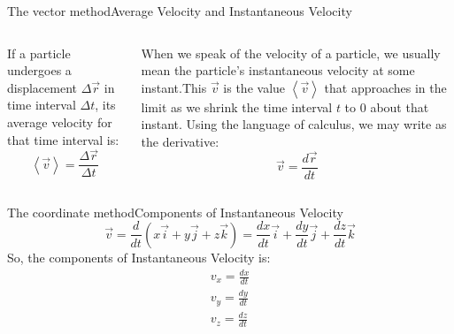 \documentclass[18pt]{LectMechanics}
\begin{document}
\begin{frame}{The vector method}{Average Velocity and Instantaneous Velocity}
	\begin{columns}
		\begin{column}{0.5\linewidth}
			If a particle undergoes a displacement $\Delta\vec r$ in time interval $\Delta t$,
			its average velocity for that time interval is:
			\begin{equation*}
				\left\langle \vec v \right\rangle = \frac{\Delta \vec r}{\Delta t}
			\end{equation*}
		\end{column}
		\begin{column}{0.5\linewidth}
			When we speak of the velocity of a particle, we usually mean the particle’s
			instantaneous velocity at some instant.This $\vec v$ is the value $\left\langle \vec v \right\rangle$ that approaches in the limit as we shrink the time interval $t$ to 0 about that instant. Using the language of calculus, we may write as the derivative:
			\begin{equation*}
				\vec v = \frac{d \vec r}{d t}
			\end{equation*}
		\end{column}
	\end{columns}
\end{frame}


\begin{frame}{The coordinate method}{Components of Instantaneous Velocity}
	\begin{equation*}
		\vec v = \frac{d}{dt} (x\vec i + y\vec j + z\vec k) = \frac{dx}{dt}\vec i + \frac{dy}{dt}\vec j + \frac{dz}{dt}\vec k
	\end{equation*}
	So, the components of Instantaneous Velocity is:
	\begin{align*}
		v_x = 	\frac{dx}{dt} \\
		v_y = 	\frac{dy}{dt} \\
		v_z = 	\frac{dz}{dt}
	\end{align*}
\end{frame}
\end{document}

